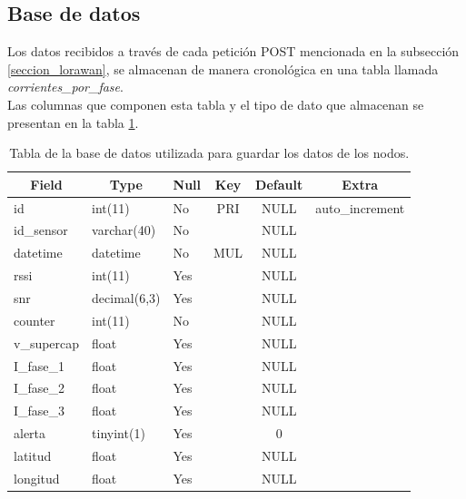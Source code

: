 \subsection{Base de datos}
Los datos recibidos a trav\'{e}s de cada petición POST mencionada en la subsecci\'{o}n \ref{seccion_lorawan}, se almacenan de manera cronológica en una tabla llamada \textit{corrientes\_por\_fase}.\\
Las columnas que componen esta tabla y el tipo de dato que almacenan se presentan en la tabla \ref{tablacorrientesporfase}.\\
\begin{table}[h]
	\centering
	\caption{Tabla de la base de datos utilizada para guardar los datos de los nodos.}
	\begin{tabular}{lllccl} 
		\hline
		\multicolumn{1}{c}{Field} & \multicolumn{1}{c}{Type} & \multicolumn{1}{c}{Null} & Key & Default & \multicolumn{1}{c}{Extra}  \\ 
		\hline
		id                        & int(11)                  & No                       & PRI & NULL    & auto\_increment            \\
		id\_sensor                & varchar(40)              & No                       &     & NULL    &                            \\
		datetime                  & datetime                 & No                       & MUL & NULL    &                            \\
		rssi                      & int(11)                  & Yes                      &     & NULL    &                            \\
		snr                       & decimal(6,3)             & Yes                      &     & NULL    &                            \\
		counter                   & int(11)                  & No                       &     & NULL    &                            \\
		v\_supercap               & float                    & Yes                      &     & NULL    &                            \\
		I\_fase\_1                & float                    & Yes                      &     & NULL    &                            \\
		I\_fase\_2                & float                    & Yes                      &     & NULL    &                            \\
		I\_fase\_3                & float                    & Yes                      &     & NULL    &                            \\
		alerta                    & tinyint(1)               & Yes                      &     & 0       &                            \\
		latitud                   & float                    & Yes                      &     & NULL    &                            \\
		longitud                  & float                    & Yes                      &     & NULL    &                            \\
		\hline
	\end{tabular}\label{tablacorrientesporfase}
\end{table}\\
